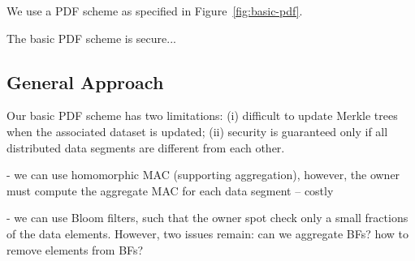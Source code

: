 We use a PDF scheme as specified in Figure~\ref{fig:basic-pdf}.

\begin{Lem}
The basic PDF scheme is secure... 
\end{Lem}

\subsection{General Approach} \label{sect:pdf-general}

Our basic PDF scheme has two limitations: (i) difficult to update Merkle trees when the associated dataset is updated; (ii) security is guaranteed only if all distributed data segments are different from each other.

- we can use homomorphic MAC (supporting aggregation), however, the owner must compute the aggregate MAC for each data segment -- costly

- we can use Bloom filters, such that the owner spot check only a small fractions of the data elements. However, two issues remain: can we aggregate BFs? how to remove elements from BFs?

